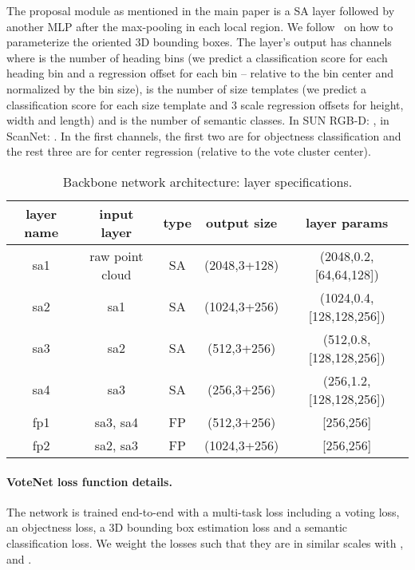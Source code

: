 \documentclass[10pt,twocolumn,letterpaper]{article}
\newcommand\votenet{VoteNet}
\begin{document}
The proposal module as mentioned in the main paper is a SA layer followed by another MLP after the max-pooling in each local region. We follow~\cite{qi2018frustum} on how to parameterize the oriented 3D bounding boxes. The layer's output has  channels where  is the number of heading bins (we predict a classification score for each heading bin and a regression offset for each bin -- relative to the bin center and normalized by the bin size),  is the number of size templates (we predict a classification score for each size template and 3 scale regression offsets for height, width and length) and  is the number of semantic classes. In SUN RGB-D: , in ScanNet: . In the first  channels, the first two are for objectness classification and the rest three are for center regression (relative to the vote cluster center). 

\begin{table*}[]
    \begin{center}
    \begin{tabular}{|c|c|c|c|c|}
    \hline
        layer name & input layer & type & output size &  layer params\\ \hline
        sa1 & raw point cloud & SA & (2048,3+128) & (2048,0.2,[64,64,128]) \\ 
        sa2 & sa1 & SA & (1024,3+256) & (1024,0.4,[128,128,256])\\
        sa3 & sa2 & SA & (512,3+256) & (512,0.8,[128,128,256]) \\
        sa4 & sa3 & SA & (256,3+256) & (256,1.2,[128,128,256]) \\
        fp1 & sa3, sa4 & FP & (512,3+256) & [256,256] \\
        fp2 & sa2, sa3 & FP & (1024,3+256) & [256,256] \\ \hline
    \end{tabular}
    \end{center}
    \caption{Backbone network architecture: layer specifications.}
    \label{tab:votingnet_detail}
\end{table*}

\paragraph{\votenet{} loss function details.}
The network is trained end-to-end with a multi-task loss including a voting loss, an objectness loss, a 3D bounding box estimation loss and a semantic classification loss. We weight the losses such that they are in similar scales with ,  and .
\end{document}
